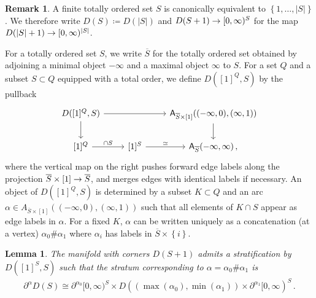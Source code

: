 \documentclass[10pt]{amsart}
\numberwithin{equation}{section}
\newtheorem{lem}[prop]{Lemma}
\theoremstyle{definition}
\newtheorem{rem}[prop]{Remark}
\newcommand{\sfA}{\mathsf{A}}
\newcommand{\del}{\partial}
\renewcommand{\to}{\mathchoice{\longrightarrow}{\rightarrow}{}{}}
\begin{document}
\begin{rem}\label{rem:D(S)}
	A finite totally ordered set $S$ is canonically equivalent to $\left\{1, \dots , \vert S \vert \right\}$.
  We therefore write $D(S) \coloneq D(\vert S \vert )$ and $D(S+1) \to [0,\infty)^{S}$ for the map $D(\vert S \vert +1 ) \to [0,\infty)^{\vert S \vert}$.
\end{rem}

For a totally ordered set $S$, we write $\overline{S}$ for the totally ordered set obtained by adjoining a minimal object $-\infty$ and a maximal object $\infty$ to $S$.
For a set $Q$ and a subset $S\subset Q$ equipped with a total order, we define $D([1]^{Q},S)$ by the pullback
\begin{equation}\label{eq:D(1^Q,S)}
	\begin{tikzcd}
		{D([1]^{Q}, S)} \arrow[rr] \arrow[d]      &&   \sfA_{\overline{S}\times [1]}( (-\infty,0), (\infty, 1))  \arrow[d] \\
		{[1]^{Q}}  \arrow[r, "\cap S"]               &   {[1]^{S} } \arrow[r, "\simeq"] & \sfA_{\overline{S}}(-\infty,\infty) \,,
	\end{tikzcd}
\end{equation}
where the vertical map on the right pushes forward edge labels along the projection $\overline{S}\times [1] \to \overline{S}$, and merges edges with identical labels if necessary.
An object of $D([1]^{Q},S)$ is determined by a subset $K\subset Q$ and an arc $\alpha \in A_{\overline{S}\times [1]}( (-\infty ,0),( \infty,1 ))$ such that all elements of $K\cap S$ appear as edge labels in $\alpha$.
For a fixed $K$, $\alpha$ can be written uniquely as a concatenation (at a vertex) $\alpha_{0}\#\alpha_{1}$ where $\alpha_{i}$ has labels in $\overline{S}\times\left\{ i \right\}$.

\begin{lem}\label{lem:D(s+1)_stratification}
	The manifold with corners $D(S+1)$ admits a stratification by $D([1]^{S},S)$ such that the stratum corresponding to $\alpha = \alpha_{0} \# \alpha_{1}$ is
	\begin{align*}
		\del^{\alpha} D(S) \cong \del^{\alpha_{0}} [0,\infty)^{S} \times D( (\max (\alpha_{0}) ,\min(\alpha_{1}) ) \times \del^{\alpha_{1}} [0,\infty)^{S} \,.
	\end{align*}
\end{lem}
\end{document}
